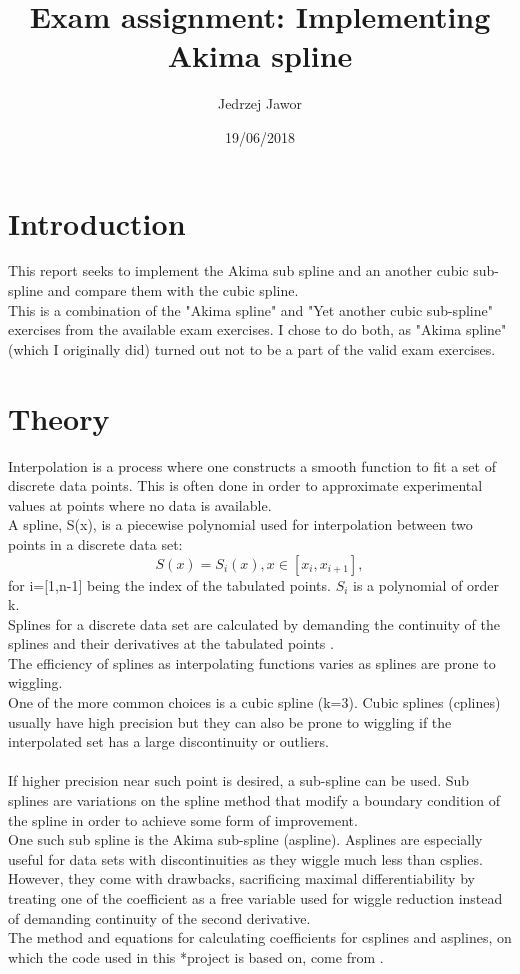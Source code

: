 \documentclass{article}
\begin{document}
\title{Exam assignment: Implementing Akima spline}
\author{Jedrzej Jawor}
\date{19/06/2018}
\maketitle

\section{Introduction}
This report seeks to implement the Akima sub spline and an another cubic sub-spline and compare them with the cubic spline.
\\
This is a combination of the "Akima spline" and "Yet another cubic sub-spline" exercises from the available exam exercises.
I chose to do both, as "Akima spline" (which I originally did) turned out not to be a part of the valid exam exercises.

\section{Theory}
Interpolation is a process where one constructs a smooth function to fit a set of discrete data points.
This is often done in order to approximate experimental values at points where no data is available.
\\
A spline, S(x), is a piecewise polynomial used for interpolation between two points in a discrete data set:
\begin{equation}
\label{eq:spline}
S(x)=S_i(x), x \in [x_i,x_{i+1}],
\end{equation}
for i=[1,n-1] being the index of the tabulated points.
$S_i$ is a polynomial of order k.
\\
Splines for a discrete data set are calculated by demanding the continuity of the splines and their 
derivatives at the tabulated points \cite{Prakprog}.
\\
The efficiency of splines as interpolating functions varies as splines are
prone to wiggling.
\\
One of the more common choices is a cubic spline (k=3). Cubic splines (cplines) usually have high precision 
but they can also be prone to wiggling if the interpolated set has a large discontinuity or outliers.
\\
\\
If higher precision near such point is desired, a sub-spline can be used. Sub splines are variations
 on the spline method that modify a boundary condition of the spline in order to achieve some form of improvement.
\\
One such sub spline is the Akima sub-spline (aspline).
Asplines are especially useful for data sets with discontinuities as they wiggle much less 
than csplies. However, they come with drawbacks, sacrificing maximal differentiability by 
treating one of the coefficient as a free variable used for wiggle reduction instead of demanding continuity of 
the second derivative.
\\
The method and equations for calculating coefficients for csplines and asplines, on which the code used in this 
*project is based on, come from \cite{Prakprog}.
\end{document}
